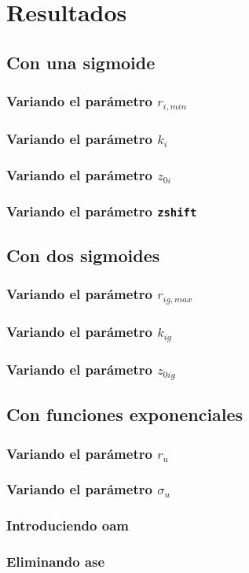 \chapter{Resultados}\label{cap:4}

\section{Con una sigmoide}

\subsection{Variando el parámetro $r_{i,min}$}

\subsection{Variando el parámetro $k_{i}$}

\subsection{Variando el parámetro $z_{0i}$} 

\subsection{Variando el parámetro \texttt{zshift}}

\section{Con dos sigmoides}

\subsection{Variando el parámetro $r_{ig,max}$}

\subsection{Variando el parámetro $k_{ig}$}

\subsection{Variando el parámetro $z_{0ig}$} 

\section{Con funciones exponenciales}

\subsection{Variando el parámetro $r_{u}$}

\subsection{Variando el parámetro \texorpdfstring{$\sigma_{u}$}{sigma-u}}

\subsection{Introduciendo \acrshort{oam}}

\subsection{Eliminando \acrshort{ase}}

